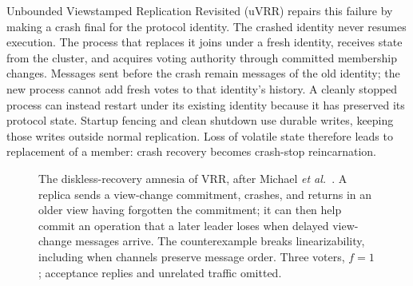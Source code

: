 \documentclass[10pt,journal,letterpaper]{IEEEtran}
\begin{document}
Unbounded Viewstamped Replication Revisited (uVRR) repairs this failure by
making a crash final for the protocol identity.
The crashed identity never resumes execution.
The process that replaces it joins under a fresh identity, receives state from
the cluster, and acquires voting authority through committed membership changes.
Messages sent before the crash remain messages of the old identity; the new
process cannot add fresh votes to that identity's history.
A cleanly stopped process can instead restart under its existing identity because
it has preserved its protocol state.
Startup fencing and clean shutdown use durable writes, keeping those writes
outside normal replication. Loss of volatile state therefore leads to replacement
of a member: crash recovery becomes crash-stop reincarnation.

\begin{figure}[t]
\centering
{}
\caption{The diskless-recovery amnesia of VRR, after Michael \emph{et al.}~\cite[Sec.~4.2 and Appendix~A.1]{diskless}. A replica sends a view-change commitment, crashes, and returns in an older view having forgotten the commitment; it can then help commit an operation that a later leader loses when delayed view-change messages arrive. The counterexample breaks linearizability, including when channels preserve message order. Three voters, $f{=}1$; acceptance replies and unrelated traffic omitted.}
\label{fig:amnesia}
\end{figure}
\end{document}
